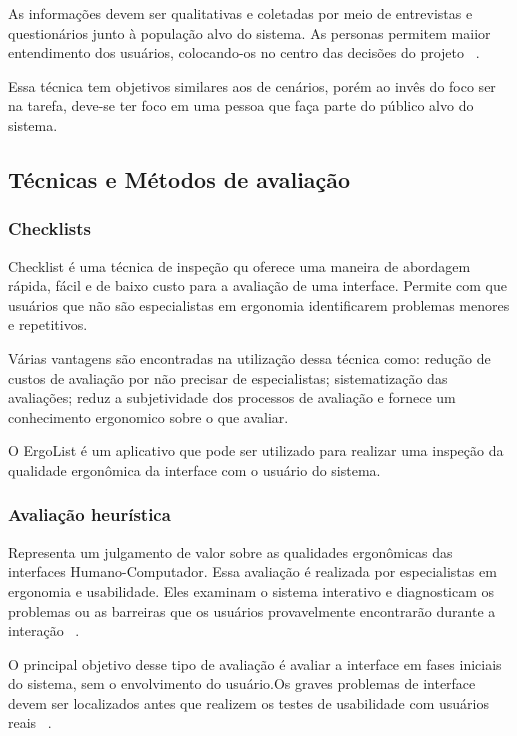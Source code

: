 	As informações devem ser qualitativas e coletadas por meio de entrevistas e questionários junto à população alvo do sistema. As personas permitem maiior entendimento dos usuários, colocando-os no centro das decisões do projeto ~\cite{cybis2010}.

	Essa técnica tem objetivos similares aos de cenários, porém ao invês do foco ser na tarefa, deve-se ter foco em uma pessoa que faça parte do público alvo do sistema.



\subsection{Técnicas e Métodos de avaliação}


\subsubsection{Checklists}

	Checklist é uma técnica de inspeção qu oferece uma maneira de abordagem rápida, fácil e de baixo custo para a avaliação de uma interface. Permite com que usuários que não são especialistas em ergonomia identificarem problemas menores e repetitivos.

	Várias vantagens são encontradas na utilização dessa técnica como: redução de custos de avaliação por não precisar de especialistas; sistematização das avaliações; reduz a subjetividade dos processos de avaliação e fornece um conhecimento ergonomico sobre o que avaliar.

	O ErgoList é um aplicativo que pode ser utilizado para realizar uma inspeção da qualidade ergonômica da interface com o usuário do sistema.

\subsubsection{Avaliação heurística}

	Representa um julgamento de valor sobre as qualidades ergonômicas das interfaces Humano-Computador. Essa avaliação é realizada por especialistas em ergonomia e usabilidade. Eles examinam o sistema interativo e diagnosticam os problemas ou as barreiras que os usuários provavelmente encontrarão durante a interação ~\cite{cybis2010}.

	O principal objetivo desse tipo de avaliação é avaliar a interface em fases iniciais do sistema, sem o envolvimento do usuário.Os graves problemas de interface devem ser localizados antes que realizem os testes de usabilidade com usuários reais ~\cite{santos2012}.

